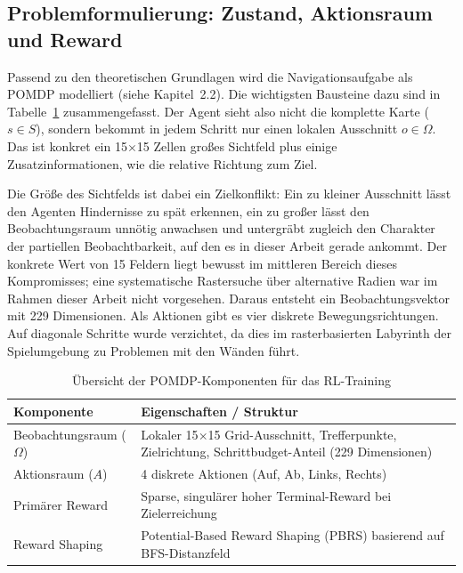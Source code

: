 \documentclass[
  a4paper,
  11pt,
  twoside,
  BCOR=8mm,           %
  headings=big,
  numbers=noenddot,
  listof=totoc,       %
  captions=tableheading,
]{scrreprt}
\begin{document}
\subsection{Problemformulierung: Zustand, Aktionsraum und Reward}
\label{sec:methodik_problemformulierung}

Passend zu den theoretischen Grundlagen wird die Navigationsaufgabe als POMDP modelliert (siehe Kapitel~2.2). Die wichtigsten Bausteine dazu sind in Tabelle~\ref{tab:pomdp_komponenten} zusammengefasst. Der Agent sieht also nicht die komplette Karte ($s \in S$), sondern bekommt in jedem Schritt nur einen lokalen Ausschnitt $o \in \Omega$. Das ist konkret ein 15$\times$15 Zellen großes Sichtfeld plus einige Zusatzinformationen, wie die relative Richtung zum Ziel.

Die Größe des Sichtfelds ist dabei ein Zielkonflikt: Ein zu kleiner Ausschnitt lässt den Agenten Hindernisse zu spät erkennen, ein zu großer lässt den Beobachtungsraum unnötig anwachsen und untergräbt zugleich den Charakter der partiellen Beobachtbarkeit, auf den es in dieser Arbeit gerade ankommt. Der konkrete Wert von 15 Feldern liegt bewusst im mittleren Bereich dieses Kompromisses; eine systematische Rastersuche über alternative Radien war im Rahmen dieser Arbeit nicht vorgesehen. Daraus entsteht ein Beobachtungsvektor mit 229 Dimensionen. Als Aktionen gibt es vier diskrete Bewegungsrichtungen. Auf diagonale Schritte wurde verzichtet, da dies im rasterbasierten Labyrinth der Spielumgebung zu Problemen mit den Wänden führt.

\begin{table}[htbp]
    \centering
    \caption{Übersicht der POMDP-Komponenten für das RL-Training}
    \label{tab:pomdp_komponenten}
    \begin{tabular}{p{4cm}p{9.8cm}}
        \toprule
        \textbf{Komponente} & \textbf{Eigenschaften / Struktur} \\
        \midrule
        Beobachtungsraum ($\Omega$) & Lokaler 15$\times$15 Grid-Ausschnitt, Trefferpunkte, Zielrichtung, Schrittbudget-Anteil (229 Dimensionen) \\
        Aktionsraum ($A$) & 4 diskrete Aktionen (Auf, Ab, Links, Rechts) \\
        Primärer Reward & Sparse, singulärer hoher Terminal-Reward bei Zielerreichung \\
        Reward Shaping & Potential-Based Reward Shaping (PBRS) basierend auf BFS-Distanzfeld \\
        \bottomrule
    \end{tabular}
\end{table}
\end{document}
